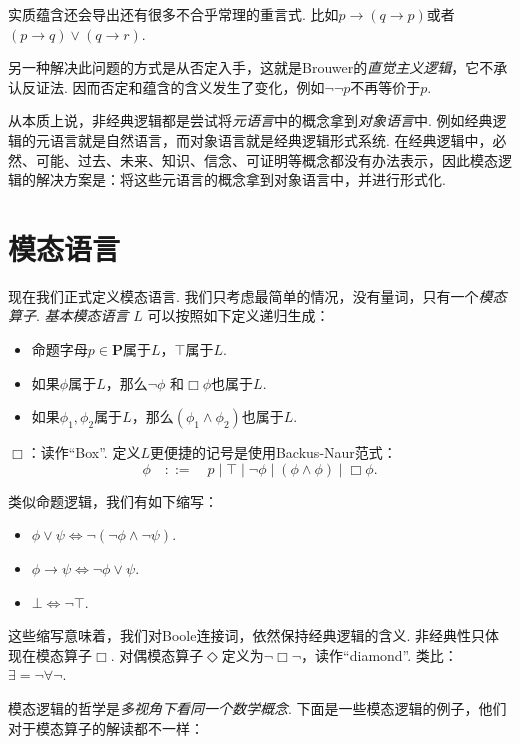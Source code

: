 实质蕴含还会导出还有很多不合乎常理的重言式. 比如$p\to(q\to p)$或者$(p\to q)\vee (q\to r)$.

另一种解决此问题的方式是从否定入手，这就是Brouwer的\emph{直觉主义逻辑}，它不承认反证法. 因而否定和蕴含的含义发生了变化，例如$\neg\neg p$不再等价于$p$. 
    
从本质上说，非经典逻辑都是尝试将\emph{元语言}中的概念拿到\emph{对象语言}中. 例如经典逻辑的元语言就是自然语言，而对象语言就是经典逻辑形式系统. 在经典逻辑中，必然、可能、过去、未来、知识、信念、可证明等概念都没有办法表示，因此模态逻辑的解决方案是：将这些元语言的概念拿到对象语言中，并进行形式化. 
    
\section{模态语言}
现在我们正式定义模态语言. 我们只考虑最简单的情况，没有量词，只有一个\emph{模态算子}. \emph{基本模态语言} $L$ 可以按照如下定义递归生成：
\begin{itemize}
    \item 命题字母$p\in \mathbf P$属于$L$，$\top$属于$L$.
    \item 如果$\phi$属于$L$，那么$\neg\phi$ 和$\Box\phi$也属于$L$.
    \item 如果$\phi_1,\phi_2$属于$L$，那么$(\phi_1\wedge\phi_2)$也属于$L$.
\end{itemize}
$\Box$：读作“Box”. 定义$L$更便捷的记号是使用Backus-Naur范式：
    \[\phi\quad::=\quad p\mid \top\mid \neg\phi\mid (\phi\wedge\phi)\mid \Box\phi.\] 

类似命题逻辑，我们有如下缩写：
\begin{itemize}
    \item $\phi\vee\psi\iff\neg(\neg \phi\wedge\neg\psi)$.
    \item $\phi\to\psi\iff\neg\phi\vee\psi$.
    \item $\bot\iff\neg\top$.
\end{itemize}
这些缩写意味着，我们对Boole连接词，依然保持经典逻辑的含义. 非经典性只体现在模态算子$\Box$. 对偶模态算子$\Diamond$定义为$\neg\Box\neg$，读作“diamond”. 类比：$\exists=\neg\forall\neg$.

模态逻辑的哲学是\emph{多视角下看同一个数学概念}. 下面是一些模态逻辑的例子，他们对于模态算子的解读都不一样：

